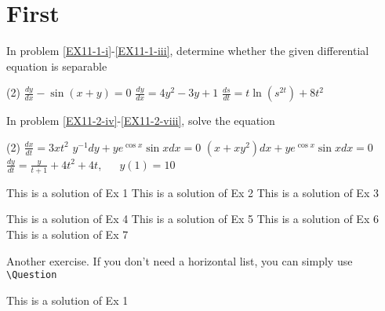 \documentclass{book}
\begin{document}
    \chapter{First}
    
    \begin{Exercise}\label{EX11}
        \vspace{-\baselineskip}%
        \Question In problem \ref{EX11-1-i}-\ref{EX11-1-iii}, determine whether the given differential equation is separable  
        \begin{tasks}(2)
            \task\label{EX11-1-i} $\frac{dy}{dx}-\sin{(x+y)}=0$     
            \task $\frac{dy}{dx}=4y^2-3y+1$ 
            \task\label{EX11-1-iii} $\frac{ds}{dt}=t\ln{(s^{2t})}+8t^2$ 
        \end{tasks}
        \Question In problem \ref{EX11-2-iv}-\ref{EX11-2-viii}, solve the equation 
        \begin{tasks}[resume=true](2)
            \task\label{EX11-2-iv} $\frac{dx}{dt}=3xt^2$
            \task $y^{-1}dy+ye^{\cos{x}}\sin{x}dx=0$
            \task $(x+xy^2)dx+ye^{\cos{x}}\sin{x}dx=0$
            \task\label{EX11-2-viii} $\frac{dy}{dt} = \frac{y}{t+1} + 4t^2 +  4t$, $\quad$ $y(1) = 10$
        \end{tasks}
    \end{Exercise}
    \begin{multicols}{2}
        \begin{Answer}[ref={EX11}]
            \Question 
            \begin{tasks}
                \task This is a solution of Ex 1
                \task This is a solution of Ex 2 
                \task This is a solution of Ex 3 
            \end{tasks} 
            \Question 
            \begin{tasks}[resume=true]
                \task This is a solution of Ex 4
                \task This is a solution of Ex 5 
                \task This is a solution of Ex 6 
                \task This is a solution of Ex 7 
            \end{tasks} 
        \end{Answer}
    \end{multicols}
    
    \begin{Exercise}\label{EX12}
        Another exercise. 
        \Question If you don't need a horizontal list, you can simply use \verb|\Question|
    \end{Exercise}
    \begin{multicols}{2}
        \begin{Answer}[ref={EX12}]
            \Question This is a solution of Ex 1
        \end{Answer}
    \end{multicols}
    
\end{document}
